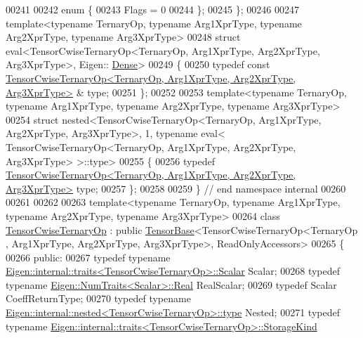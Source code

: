 \begin{DoxyCode}
00241 
00242   \textcolor{keyword}{enum} \{
00243     Flags = 0
00244   \};
00245 \};
00246 
00247 \textcolor{keyword}{template}<\textcolor{keyword}{typename} TernaryOp, \textcolor{keyword}{typename} Arg1XprType, \textcolor{keyword}{typename} Arg2XprType, \textcolor{keyword}{typename} Arg3XprType>
00248 \textcolor{keyword}{struct }eval<TensorCwiseTernaryOp<TernaryOp, Arg1XprType, Arg2XprType, Arg3XprType>, Eigen::
      \hyperlink{struct_eigen_1_1_dense}{Dense}>
00249 \{
00250   \textcolor{keyword}{typedef} \textcolor{keyword}{const} 
      \hyperlink{class_eigen_1_1_tensor_cwise_ternary_op}{TensorCwiseTernaryOp<TernaryOp, Arg1XprType, Arg2XprType, Arg3XprType>}
      & type;
00251 \};
00252 
00253 \textcolor{keyword}{template}<\textcolor{keyword}{typename} TernaryOp, \textcolor{keyword}{typename} Arg1XprType, \textcolor{keyword}{typename} Arg2XprType, \textcolor{keyword}{typename} Arg3XprType>
00254 \textcolor{keyword}{struct }nested<TensorCwiseTernaryOp<TernaryOp, Arg1XprType, Arg2XprType, Arg3XprType>, 1, typename eval<
      TensorCwiseTernaryOp<TernaryOp, Arg1XprType, Arg2XprType, Arg3XprType> >::type>
00255 \{
00256   \textcolor{keyword}{typedef} \hyperlink{class_eigen_1_1_tensor_cwise_ternary_op}{TensorCwiseTernaryOp<TernaryOp, Arg1XprType, Arg2XprType, Arg3XprType>}
       type;
00257 \};
00258 
00259 \}  \textcolor{comment}{// end namespace internal}
00260 
00261 
00262 
00263 \textcolor{keyword}{template}<\textcolor{keyword}{typename} TernaryOp, \textcolor{keyword}{typename} Arg1XprType, \textcolor{keyword}{typename} Arg2XprType, \textcolor{keyword}{typename} Arg3XprType>
00264 \textcolor{keyword}{class }\hyperlink{class_eigen_1_1_tensor_cwise_ternary_op}{TensorCwiseTernaryOp} : \textcolor{keyword}{public} \hyperlink{class_eigen_1_1_tensor_base}{TensorBase}<TensorCwiseTernaryOp<TernaryOp
      , Arg1XprType, Arg2XprType, Arg3XprType>, ReadOnlyAccessors>
00265 \{
00266   \textcolor{keyword}{public}:
00267     \textcolor{keyword}{typedef} \textcolor{keyword}{typename} \hyperlink{struct_eigen_1_1internal_1_1traits}{Eigen::internal::traits<TensorCwiseTernaryOp>::Scalar}
       Scalar;
00268     \textcolor{keyword}{typedef} \textcolor{keyword}{typename} \hyperlink{group___sparse_core___module}{Eigen::NumTraits<Scalar>::Real} RealScalar;
00269     \textcolor{keyword}{typedef} Scalar CoeffReturnType;
00270     \textcolor{keyword}{typedef} \textcolor{keyword}{typename} \hyperlink{class_eigen_1_1internal_1_1_tensor_lazy_evaluator_writable}{Eigen::internal::nested<TensorCwiseTernaryOp>::type}
       Nested;
00271     \textcolor{keyword}{typedef} \textcolor{keyword}{typename} \hyperlink{struct_eigen_1_1internal_1_1traits}{Eigen::internal::traits<TensorCwiseTernaryOp>::StorageKind}

\end{DoxyCode}
